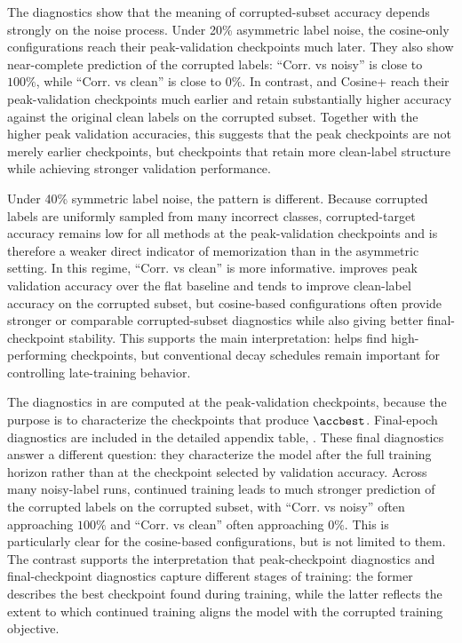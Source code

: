 The diagnostics show that the meaning of corrupted-subset accuracy depends strongly on
the noise process. Under 20\% asymmetric label noise, the cosine-only configurations
reach their peak-validation checkpoints much later. They also show near-complete
prediction of the corrupted labels: ``Corr. vs noisy'' is close to $100\%$, while
``Corr. vs clean'' is close to $0\%$. In contrast, \method{} and Cosine+\method{} reach
their peak-validation checkpoints much earlier and retain substantially higher accuracy
against the original clean labels on the corrupted subset. Together with the higher peak
validation accuracies, this suggests that the \method{} peak checkpoints are not merely
earlier checkpoints, but checkpoints that retain more clean-label structure while
achieving stronger validation performance.

Under 40\% symmetric label noise, the pattern is different. Because corrupted labels are
uniformly sampled from many incorrect classes, corrupted-target accuracy remains low
for all methods at the peak-validation checkpoints and is therefore a weaker direct
indicator of memorization than in the asymmetric setting. In this regime, ``Corr. vs
clean'' is more informative. \method{} improves peak validation accuracy over the flat
baseline and tends to improve clean-label accuracy on the corrupted subset, but
cosine-based configurations often provide stronger or comparable corrupted-subset
diagnostics while also giving better final-checkpoint stability. This supports the main
interpretation: \method{} helps find high-performing checkpoints, but conventional decay
schedules remain important for controlling late-training behavior.

The diagnostics in  are computed at the
peak-validation checkpoints, because the purpose is to characterize the checkpoints that
produce $\accbest$. Final-epoch diagnostics are included in the detailed appendix table,
. These final diagnostics answer a different
question: they characterize the model after the full training horizon rather than at the
checkpoint selected by validation accuracy. Across many noisy-label runs, continued
training leads to much stronger prediction of the corrupted labels on the corrupted
subset, with ``Corr. vs noisy'' often approaching $100\%$ and ``Corr. vs clean'' often
approaching $0\%$. This is particularly clear for the cosine-based configurations, but is
not limited to them. The contrast supports the interpretation that peak-checkpoint
diagnostics and final-checkpoint diagnostics capture different stages of training: the
former describes the best checkpoint found during training, while the latter reflects the
extent to which continued training aligns the model with the corrupted training
objective.

